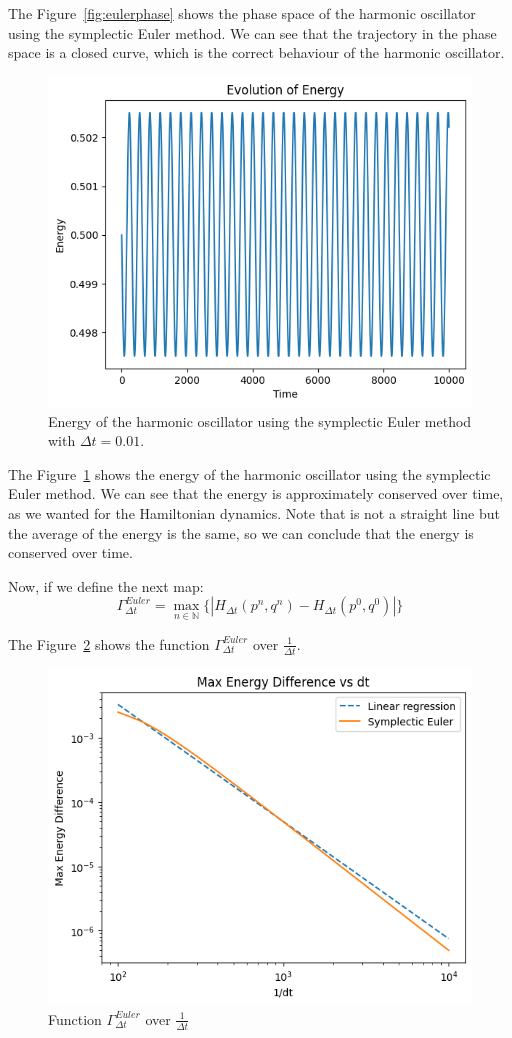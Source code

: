 \documentclass{report}
\begin{document}
The Figure~\ref{fig:eulerphase} shows the phase space of the harmonic oscillator using the symplectic Euler method. We can see that the trajectory in the phase space is a closed curve, which is the correct behaviour of the harmonic oscillator.

\begin{figure}[H]
	\centering
	\includegraphics[width=0.5\linewidth]{./Figures/Sympletic/eulerenergy.png}
	\caption{Energy of the harmonic oscillator using the symplectic Euler method with \(\Delta t = 0.01\).}
	\label{fig:eulerenergy}
\end{figure}

The Figure~\ref{fig:eulerenergy} shows the energy of the harmonic oscillator using the symplectic Euler method. We can see that the energy is approximately conserved over time, as we wanted for the Hamiltonian dynamics. Note that is not a straight line but the average of the energy is the same, so we can conclude that the energy is conserved over time.

Now, if we define the next map:
\[
	\Gamma_{\Delta t}^{Euler} = \max_{n \in \mathbb{N}}\{|H_{\Delta t}(p^n, q^n) - H_{\Delta t}(p^0, q^0)|\}
\]

The Figure~\ref*{fig:eulermaxenergy} shows the function \(\Gamma_{\Delta t}^{Euler}\) over \(\frac{1}{\Delta t}\).

\begin{figure}[H]
	\centering
	\includegraphics[width=0.5\linewidth]{./Figures/Sympletic/eulermaxenergy.png}
	\caption{Function \(\Gamma_{\Delta t}^{Euler}\) over \(\frac{1}{\Delta t}\)}
	\label{fig:eulermaxenergy}
\end{figure}
\end{document}
